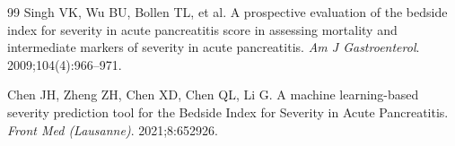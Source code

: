 \documentclass[12pt,a4paper]{article}
\begin{document}
\begin{thebibliography}{99}
Singh VK, Wu BU, Bollen TL, et al.
\newblock A prospective evaluation of the bedside index for severity in acute pancreatitis score in assessing mortality and intermediate markers of severity in acute pancreatitis.
\newblock \textit{Am J Gastroenterol}. 2009;104(4):966--971.
\newblock {}

Chen JH, Zheng ZH, Chen XD, Chen QL, Li G.
\newblock A machine learning-based severity prediction tool for the Bedside Index for Severity in Acute Pancreatitis.
\newblock \textit{Front Med (Lausanne)}. 2021;8:652926.
\newblock {}

\end{thebibliography}
\end{document}
